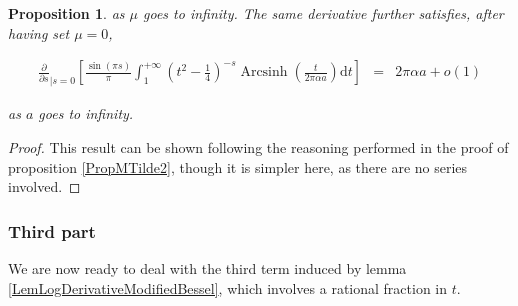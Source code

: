 \documentclass{jams-l}
\newtheorem{proposition}[theorem]{Proposition}
\theoremstyle{definition}
\theoremstyle{remark}
\numberwithin{equation}{section}
\DeclareMathOperator{\arcsinh}{Arcsinh}
\begin{document}
\begin{proposition}
                    \noindent as $\mu$ goes to infinity. The same derivative further satisfies, after having set $\mu = 0$,
                    
                    \[ \begin{array}{lll}
                            \scriptstyle \frac{\partial}{\partial s}_{\left \vert s = 0 \right.} \left[ \frac{\sin \left( \pi s \right)}{\pi} \int_1^{+ \infty} \left( t^2 - \frac{1}{4} \right)^{-s} \arcsinh \left( \frac{t}{2 \pi \alpha a} \right) \mathrm{d}t \right] & \scriptstyle = & \scriptstyle 2 \pi \alpha a + o \left( 1 \right)
                        \end{array} \]
                    
                    \noindent as $a$ goes to infinity.
                
                \end{proposition}
                
                \begin{proof}
                
                    This result can be shown following the reasoning performed in the proof of proposition \ref{PropMTilde2}, though it is simpler here, as there are no series involved.
                
                \end{proof}
                
                
            \subsubsection*{\textbf{Third part}}
            \label{MTildeThirdPart}
            
                We are now ready to deal with the third term induced by lemma \ref{LemLogDerivativeModifiedBessel}, which involves a rational fraction in $t$.
                
\end{document}
